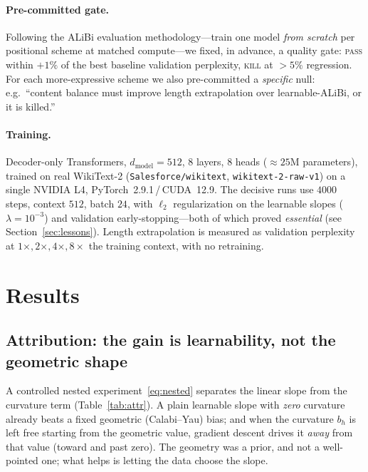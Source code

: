 \documentclass[11pt,a4paper]{article}
\begin{document}
\paragraph{Pre-committed gate.} Following the ALiBi evaluation
methodology---train one model \emph{from scratch} per positional scheme at
matched compute---we fixed, in advance, a quality gate: \textsc{pass} within
$+1\%$ of the best baseline validation perplexity, \textsc{kill} at $>5\%$
regression. For each more-expressive scheme we also pre-committed a
\emph{specific} null: e.g.\ ``content balance must improve length extrapolation
over learnable-ALiBi, or it is killed.''

\paragraph{Training.} Decoder-only Transformers, $d_{\text{model}}=512$, $8$
layers, $8$ heads ($\approx 25$M parameters), trained on real WikiText-2
(\texttt{Salesforce/wikitext}, \texttt{wikitext-2-raw-v1}) on a single NVIDIA L4,
PyTorch~2.9.1\,/\,CUDA~12.9. The decisive runs use $4000$ steps, context $512$,
batch $24$, with $\ell_2$ regularization on the learnable slopes ($\lambda=10^{-3}$)
and validation early-stopping---both of which proved \emph{essential} (see
Section~\ref{sec:lessons}). Length extrapolation is measured as validation
perplexity at $1\times,2\times,4\times,8\times$ the training context, with no
retraining.

\section{Results}
\label{sec:results}

\subsection{Attribution: the gain is learnability, not the geometric shape}
A controlled nested experiment~\eqref{eq:nested} separates the linear slope from
the curvature term (Table~\ref{tab:attr}). A plain learnable slope with
\emph{zero} curvature already beats a fixed geometric (Calabi--Yau) bias; and
when the curvature $b_h$ is left free starting from the geometric value, gradient
descent drives it \emph{away} from that value (toward and past zero). The
geometry was a prior, and not a well-pointed one; what helps is letting the data
choose the slope.
\end{document}
